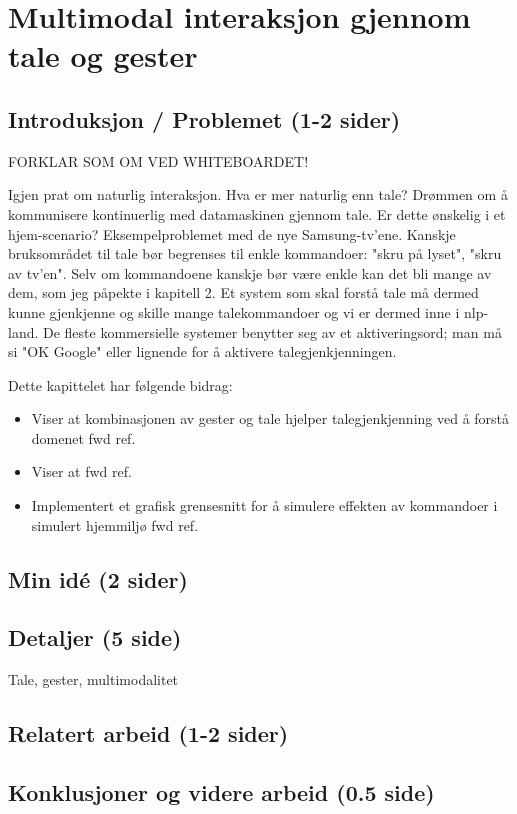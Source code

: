 \section{Multimodal interaksjon gjennom tale og gester}
\subsection{Introduksjon / Problemet (1-2 sider)}
{\color{red} FORKLAR SOM OM VED WHITEBOARDET!}

Igjen prat om naturlig interaksjon. Hva er mer naturlig enn tale? Drømmen om å kommunisere kontinuerlig med datamaskinen gjennom tale. Er dette ønskelig i et hjem-scenario? Eksempelproblemet med de nye Samsung-tv'ene. Kanskje bruksområdet til tale bør begrenses til enkle kommandoer: "skru på lyset", "skru av tv'en". Selv om kommandoene kanskje bør være enkle kan det bli mange av dem, som jeg påpekte i kapitell 2. Et system som skal forstå tale må dermed kunne gjenkjenne og skille mange talekommandoer og vi er dermed inne i nlp-land. De fleste kommersielle systemer benytter seg av et aktiveringsord; man må si "OK Google" eller lignende for å aktivere talegjenkjenningen. 

Dette kapittelet har følgende bidrag:
\begin{itemize}
\item Viser at kombinasjonen av gester og tale hjelper talegjenkjenning ved å forstå domenet {\color{red} fwd ref}.
\item Viser at  {\color{red} fwd ref}.
\item Implementert et grafisk grensesnitt for å simulere effekten av kommandoer i simulert hjemmiljø {\color{red} fwd ref}.
\end{itemize}

\subsection{Min idé (2 sider)}

\subsection{Detaljer (5 side)}
Tale, gester, multimodalitet

\subsection{Relatert arbeid (1-2 sider)}

\subsection{Konklusjoner og videre arbeid (0.5 side)}

